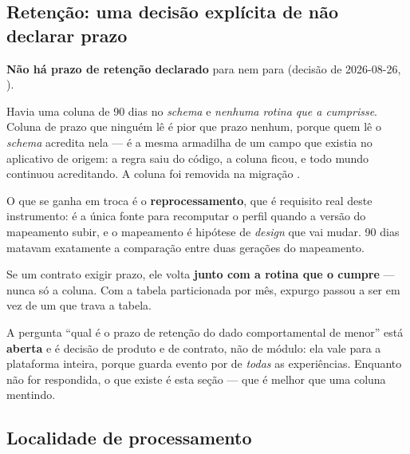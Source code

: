 \subsection{Retenção: uma decisão explícita de não declarar prazo}

\begin{decisao}
\textbf{Não há prazo de retenção declarado} para  nem para
 (decisão de 2026-08-26, ).

Havia uma coluna  de 90 dias no \emph{schema} e \emph{nenhuma
rotina que a cumprisse}. Coluna de prazo que ninguém lê é pior que prazo nenhum,
porque quem lê o \emph{schema} acredita nela --- é a mesma armadilha de um campo
 que existia no aplicativo de origem: a regra saiu do
código, a coluna ficou, e todo mundo continuou acreditando. A coluna foi removida
na migração .

O que se ganha em troca é o \textbf{reprocessamento}, que é requisito real deste
instrumento:  é a única fonte para recomputar o perfil quando a versão
do mapeamento subir, e o mapeamento é hipótese de \emph{design} que vai mudar. 90
dias matavam exatamente a comparação entre duas gerações do mapeamento.

Se um contrato exigir prazo, ele volta \textbf{junto com a rotina que o cumpre}
--- nunca só a coluna. Com a tabela particionada por mês, expurgo passou a ser
 em vez de um  que trava a tabela.
\end{decisao}

\begin{limitacao}
A pergunta \enquote{qual é o prazo de retenção do dado comportamental de menor}
está \textbf{aberta} e é decisão de produto e de contrato, não de módulo: ela vale
para a plataforma inteira, porque  guarda evento por
 de \emph{todas} as experiências. Enquanto não for respondida, o
que existe é esta seção --- que é melhor que uma coluna mentindo.
\end{limitacao}

\subsection{Localidade de processamento}

